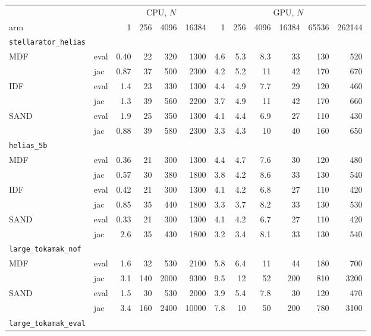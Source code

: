 \begin{tabular}{llrrrrrrrrrr}
\toprule
 & & \multicolumn{4}{c}{CPU, $N$} & \multicolumn{6}{c}{GPU, $N$} \\
\cmidrule(lr){3-6} \cmidrule(lr){7-12}
arm & & 1 & 256 & 4096 & 16384 & 1 & 256 & 4096 & 16384 & 65536 & 262144 \\
\midrule
\rule{0pt}{2.4ex}\texttt{stellarator\_helias} & & & & & & & & & & & \\
MDF & eval & 0.40 & 22 & 320 & 1300 & 4.6 & 5.3 & 8.3 & 33 & 130 & 520 \\
 & jac & 0.87 & 37 & 500 & 2300 & 4.2 & 5.2 & 11 & 42 & 170 & 670 \\
IDF & eval & 1.4 & 23 & 330 & 1300 & 4.4 & 4.9 & 7.7 & 29 & 120 & 460 \\
 & jac & 1.3 & 39 & 560 & 2200 & 3.7 & 4.9 & 11 & 42 & 170 & 660 \\
SAND & eval & 1.9 & 25 & 350 & 1300 & 4.1 & 4.4 & 6.9 & 27 & 110 & 430 \\
 & jac & 0.88 & 39 & 580 & 2300 & 3.3 & 4.3 & 10 & 40 & 160 & 650 \\
\midrule
\rule{0pt}{2.4ex}\texttt{helias\_5b} & & & & & & & & & & & \\
MDF & eval & 0.36 & 21 & 300 & 1300 & 4.4 & 4.7 & 7.6 & 30 & 120 & 480 \\
 & jac & 0.57 & 30 & 380 & 1800 & 3.8 & 4.2 & 8.6 & 33 & 130 & 540 \\
IDF & eval & 0.42 & 21 & 300 & 1300 & 4.1 & 4.2 & 6.8 & 27 & 110 & 420 \\
 & jac & 0.85 & 35 & 440 & 1800 & 3.3 & 3.7 & 8.2 & 33 & 130 & 530 \\
SAND & eval & 0.33 & 21 & 300 & 1300 & 4.1 & 4.2 & 6.7 & 27 & 110 & 420 \\
 & jac & 2.6 & 35 & 430 & 1800 & 3.2 & 3.4 & 8.1 & 33 & 130 & 540 \\
\midrule
\rule{0pt}{2.4ex}\texttt{large\_tokamak\_nof} & & & & & & & & & & & \\
MDF & eval & 1.6 & 32 & 530 & 2100 & 5.8 & 6.4 & 11 & 44 & 180 & 700 \\
 & jac & 3.1 & 140 & 2000 & 9300 & 9.5 & 12 & 52 & 200 & 810 & 3200 \\
SAND & eval & 1.5 & 30 & 530 & 2000 & 3.9 & 5.4 & 7.8 & 30 & 120 & 470 \\
 & jac & 3.4 & 160 & 2400 & 10000 & 7.8 & 10 & 50 & 200 & 780 & 3100 \\
\midrule
\rule{0pt}{2.4ex}\texttt{large\_tokamak\_eval} & & & & & & & & & & & \\

\end{tabular}
